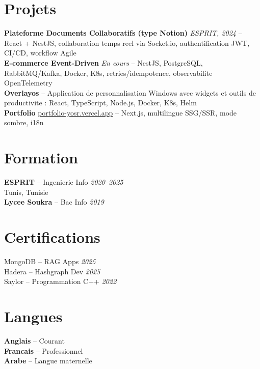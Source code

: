 \documentclass[10pt,a4paper]{article}
\begin{document}
\section*{Projets}
{\small

\textbf{Plateforme Documents Collaboratifs (type Notion)} \;\textbar\; \textit{ESPRIT, 2024} --
React + NestJS, collaboration temps reel via Socket.io, authentification JWT, CI/CD, workflow Agile\\[2pt]
\textbf{E-commerce Event-Driven} \;\textbar\; \textit{En cours} --
NestJS, PostgreSQL, RabbitMQ/Kafka, Docker, K8s, retries/idempotence, observabilite OpenTelemetry\\[2pt]
\textbf{Overlayos} --
Application de personnalisation Windows avec widgets et outils de productivite : React, TypeScript, Node.js, Docker, K8s, Helm\\[2pt]
\textbf{Portfolio} \;\textbar\; \href{https://portfolio-yosr.vercel.app/en}{portfolio-yosr.vercel.app} --
Next.js, multilingue SSG/SSR, mode sombre, i18n

}

\section*{Formation}
{\footnotesize
\textbf{ESPRIT} -- Ingenierie Info \hfill \textit{2020--2025}\\
Tunis, Tunisie\\[2pt]
\textbf{Lycee Soukra} -- Bac Info \hfill \textit{2019}
}

\section*{Certifications}
{\footnotesize
MongoDB -- RAG Apps \hfill \textit{2025}\\
Hadera -- Hashgraph Dev \hfill \textit{2025}\\
Saylor -- Programmation C++ \hfill \textit{2022}
}

\section*{Langues}
{\footnotesize
\textbf{Anglais} -- Courant\\
\textbf{Francais} -- Professionnel\\
\textbf{Arabe} -- Langue maternelle
}
\end{document}
